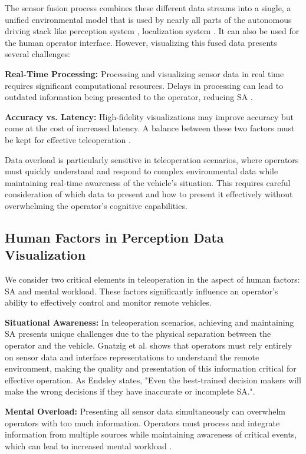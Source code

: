 The sensor fusion process combines these different data streams into a single, a unified environmental
model that is used by nearly all parts of the autonomous driving stack like perception system \cite{feng2020deep}
, localization system \cite{feng2020deep, el-sheimy2020sensorfusion}. It can also be used for the human operator interface.
However, visualizing this fused data presents several challenges:

\textbf{Real-Time Processing:} Processing and visualizing sensor data in real time requires significant computational resources. Delays in processing can lead to outdated information being presented to the operator, reducing \ac{SA} \cite{Gnatzig}.

\textbf{Accuracy vs. Latency:} High-fidelity visualizations may improve accuracy but come at the cost of increased latency. A balance between these two factors must be kept for effective teleoperation \cite{chucholowski2014teleoperated}.

Data overload is particularly sensitive in teleoperation scenarios, where operators must quickly understand and respond to complex environmental data while maintaining real-time awareness of the vehicle's situation. This requires careful consideration of which data to present and how to present it effectively without overwhelming the operator's cognitive capabilities.

\subsection{Human Factors in Perception Data Visualization}\label{subsection:humanfactors}
We consider two critical elements in teleoperation in the aspect of human factors: \ac{SA} and mental workload. These factors significantly influence an operator's ability to effectively control and monitor remote vehicles.

\textbf{Situational Awareness:} In teleoperation scenarios, achieving and maintaining \ac{SA} presents unique challenges due to the physical separation between the operator and the vehicle. Gnatzig et al. \cite{Gnatzig} shows that operators must rely entirely on sensor data and interface representations to understand the remote environment, making the quality and presentation of this information critical for effective operation.  As Endsley \cite{endsley1995toward} states, "Even the
best-trained decision makers will make the wrong decisions if they have inaccurate or incomplete SA.".

\textbf{Mental Overload:} Presenting all sensor data simultaneously can overwhelm operators with too much information.
Operators must process and integrate information from multiple sources while maintaining awareness of critical events, which can lead to increased mental workload \cite{wickens2008multiple}.

